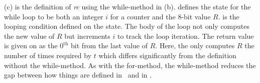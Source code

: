 (c) is the definition of \emph{rc} using the while-method in (b).
 defines the state for the while loop to be both an integer $i$ for a counter and the 8-bit value $R$.
 is the looping condition defined on the state.
The body of the loop not only computes the new value of $R$ but  increments $i$ to track the loop iteration.
The return value is given on  as the $0^\mathrm{th}$ bit from the last value of $R$.
Here, the only computes $R$ the number of times required by $t$ which differs significantly from the definition without the while-method.
As with the for-method, the while-method reduces the gap between how things are defined in \fips\ and in \cryptol.
